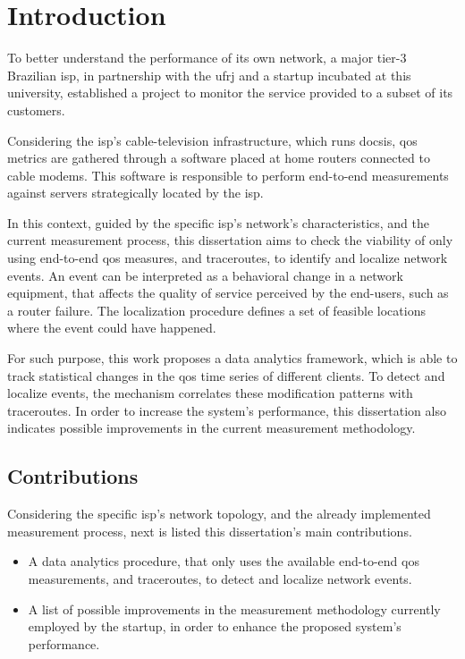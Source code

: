 \chapter{Introduction}

To better understand the performance of its own network, a major
tier-3 Brazilian \gls*{isp}, in partnership with the \gls*{ufrj} and a startup
incubated at this university,
established a project to monitor the service provided to a subset
of its customers.

Considering the \gls*{isp}'s cable-television infrastructure,
which runs \gls*{docsis},
\gls*{qos} metrics are gathered through a software placed at home routers
connected to cable modems. This software is responsible to perform end-to-end
measurements against servers strategically located by the \gls*{isp}.

In this context, guided by the specific \gls*{isp}'s network's characteristics,
and the current measurement process,
this dissertation aims to check the viability of
only using end-to-end \gls*{qos} measures, and traceroutes,
to identify and localize network events. An event can be interpreted as a
behavioral change in a network equipment, that affects the quality of service
perceived by the end-users,
such as a router failure. The localization procedure defines a set of
feasible locations where the event could have happened.

For such purpose, this work proposes a data analytics framework, which is able
to track statistical changes in the \gls*{qos} time series of different
clients.
To detect and localize events, the mechanism correlates these modification
patterns with traceroutes.
In order to increase the system's performance,
this dissertation also indicates possible improvements in the current
measurement methodology.

\section{Contributions}

Considering the specific \gls*{isp}'s network topology,
and the already implemented
measurement process, next is listed this dissertation's main contributions.

\begin{itemize}
\item
A data analytics procedure, that only uses the available end-to-end \gls*{qos}
measurements, and traceroutes, to detect and localize network events.

\item
A list of possible improvements in the measurement methodology currently
employed by the startup, in order to enhance the proposed system's performance.

\end{itemize}

